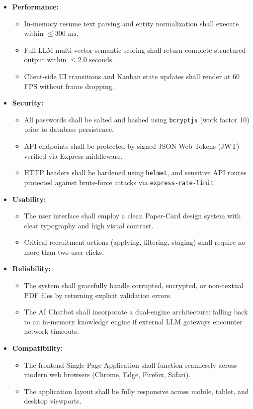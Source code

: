 \documentclass[12pt, a4paper]{article}
\begin{document}
\begin{itemize}[leftmargin=1.5em, itemsep=4pt]
    \item \textbf{Performance:}
    \begin{itemize}[leftmargin=1.2em]
        \item In-memory resume text parsing and entity normalization shall execute within $\le 300\text{ ms}$.
        \item Full LLM multi-vector semantic scoring shall return complete structured output within $\le 2.0\text{ seconds}$.
        \item Client-side UI transitions and Kanban state updates shall render at 60 FPS without frame dropping.
    \end{itemize}
    \item \textbf{Security:}
    \begin{itemize}[leftmargin=1.2em]
        \item All passwords shall be salted and hashed using \texttt{bcryptjs} (work factor 10) prior to database persistence.
        \item API endpoints shall be protected by signed JSON Web Tokens (JWT) verified via Express middleware.
        \item HTTP headers shall be hardened using \texttt{helmet}, and sensitive API routes protected against brute-force attacks via \texttt{express-rate-limit}.
    \end{itemize}
    \item \textbf{Usability:}
    \begin{itemize}[leftmargin=1.2em]
        \item The user interface shall employ a clean Paper-Card design system with clear typography and high visual contrast.
        \item Critical recruitment actions (applying, filtering, staging) shall require no more than two user clicks.
    \end{itemize}
    \item \textbf{Reliability:}
    \begin{itemize}[leftmargin=1.2em]
        \item The system shall gracefully handle corrupted, encrypted, or non-textual PDF files by returning explicit validation errors.
        \item The AI Chatbot shall incorporate a dual-engine architecture: falling back to an in-memory knowledge engine if external LLM gateways encounter network timeouts.
    \end{itemize}
    \item \textbf{Compatibility:}
    \begin{itemize}[leftmargin=1.2em]
        \item The frontend Single Page Application shall function seamlessly across modern web browsers (Chrome, Edge, Firefox, Safari).
        \item The application layout shall be fully responsive across mobile, tablet, and desktop viewports.
    \end{itemize}
\end{itemize}
\end{document}

